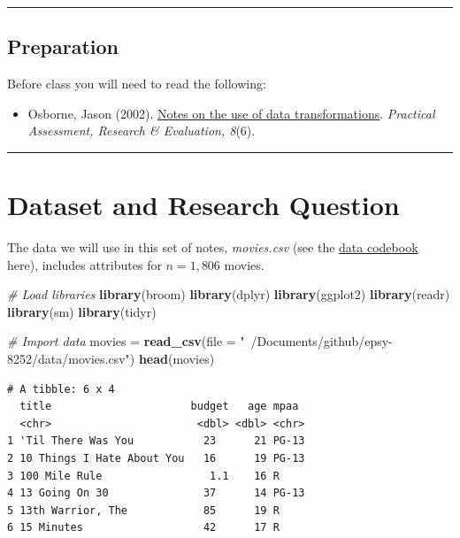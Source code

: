 \documentclass[]{book}
\newenvironment{Shaded}{\begin{snugshade}}{\end{snugshade}}
\newcommand{\CommentTok}[1]{\textcolor[rgb]{0.56,0.35,0.01}{\textit{#1}}}
\newcommand{\DataTypeTok}[1]{\textcolor[rgb]{0.13,0.29,0.53}{#1}}
\newcommand{\KeywordTok}[1]{\textcolor[rgb]{0.13,0.29,0.53}{\textbf{#1}}}
\newcommand{\NormalTok}[1]{#1}
\newcommand{\StringTok}[1]{\textcolor[rgb]{0.31,0.60,0.02}{#1}}
\providecommand{\tightlist}{%
  \setlength{\itemsep}{0pt}\setlength{\parskip}{0pt}}
\begin{document}
\begin{center}\rule{0.5\linewidth}{\linethickness}\end{center}

\hypertarget{preparation-2}{%
\subsection*{Preparation}\label{preparation-2}}

Before class you will need to read the following:

\begin{itemize}
\tightlist
\item
  Osborne, Jason (2002). \href{https://pareonline.net/getvn.asp?v=8\&n=6}{Notes on the use of data transformations}. \emph{Practical Assessment, Research \& Evaluation, 8}(6).
\end{itemize}

\begin{center}\rule{0.5\linewidth}{\linethickness}\end{center}

\hypertarget{dataset-and-research-question-1}{%
\section{Dataset and Research Question}\label{dataset-and-research-question-1}}

The data we will use in this set of notes, \emph{movies.csv} (see the \protect\hyperlink{movies}{data codebook} here), includes attributes for \(n=1,806\) movies.

\begin{Shaded}
\begin{Highlighting}[]
\CommentTok{# Load libraries}
\KeywordTok{library}\NormalTok{(broom)}
\KeywordTok{library}\NormalTok{(dplyr)}
\KeywordTok{library}\NormalTok{(ggplot2)}
\KeywordTok{library}\NormalTok{(readr)}
\KeywordTok{library}\NormalTok{(sm)}
\KeywordTok{library}\NormalTok{(tidyr)}

\CommentTok{# Import data}
\NormalTok{movies =}\StringTok{ }\KeywordTok{read_csv}\NormalTok{(}\DataTypeTok{file =} \StringTok{"~/Documents/github/epsy-8252/data/movies.csv"}\NormalTok{)}
\KeywordTok{head}\NormalTok{(movies)}
\end{Highlighting}
\end{Shaded}

\begin{verbatim}
# A tibble: 6 x 4
  title                      budget   age mpaa 
  <chr>                       <dbl> <dbl> <chr>
1 'Til There Was You           23      21 PG-13
2 10 Things I Hate About You   16      19 PG-13
3 100 Mile Rule                 1.1    16 R    
4 13 Going On 30               37      14 PG-13
5 13th Warrior, The            85      19 R    
6 15 Minutes                   42      17 R    
\end{verbatim}
\end{document}
